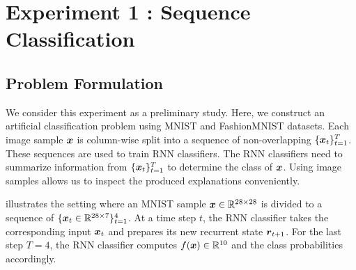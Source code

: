 

 

\section{Experiment 1 : Sequence Classification}
\label{sec:exp1}

\subsection{Problem Formulation}
We consider this experiment as a preliminary study. Here, we construct an artificial classification problem using MNIST and FashionMNIST datasets. Each image sample $\boldsymbol{x}$ is column-wise split into a sequence of non-overlapping $\{ \boldsymbol{x}_t \}_{t=1}^{T}$. These sequences are used to train RNN classifiers. The RNN classifiers need to summarize information from $\{ \boldsymbol{x}_t \}_{t=1}^{T}$ to determine the class of $\boldsymbol{x}$.  Using image samples allows us to inspect the produced explanations conveniently.

\addfigure{\ref{fig:artificial_problem}} illustrates the setting where an MNIST sample $ \patvector{x} \in \mathbb{R}^{28 \times 28}$ is divided to a sequence of $\{ \patvector{x}_t \in   \mathbb{R}^{28 \times 7} \}_{t=1} ^ 4$. At  a time step $t$, the RNN classifier takes the corresponding input $\patvector{x}_t$ and prepares its new recurrent state $\patvector{r}_{t+1}$. For the last step $T = 4$, the RNN classifier computes $f(\boldsymbol{x}) \in \mathbb{R}^{10}$ and the class probabilities accordingly.



